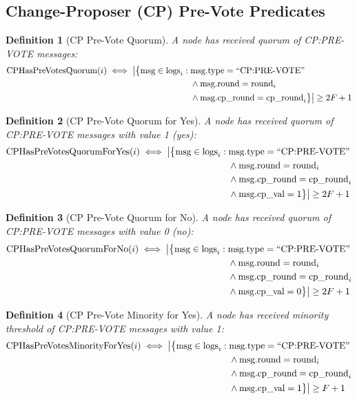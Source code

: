 \documentclass[11pt,a4paper,twoside]{article}
\newtheorem{definition}{Definition}[section]
\begin{document}
\subsection{Change-Proposer (CP) Pre-Vote Predicates}

\begin{definition}[CP Pre-Vote Quorum]
A node has received quorum of CP:PRE-VOTE messages:
\begin{align}
\text{CPHasPreVotesQuorum}(i) \iff \big|\big\{\text{msg} \in \text{logs}_i : {} & \text{msg.type} = \text{``CP:PRE-VOTE''} \notag \\
& \land \text{msg.round} = \text{round}_i \notag \\
& \land \text{msg.cp\_round} = \text{cp\_round}_i\big\}\big| \geq 2F + 1
\end{align}
\end{definition}

\begin{definition}[CP Pre-Vote Quorum for Yes]
A node has received quorum of CP:PRE-VOTE messages with value 1 (yes):
\begin{align}
\text{CPHasPreVotesQuorumForYes}(i) \iff \big|\big\{\text{msg} \in \text{logs}_i : {} & \text{msg.type} = \text{``CP:PRE-VOTE''} \notag \\
& \land \text{msg.round} = \text{round}_i \notag \\
& \land \text{msg.cp\_round} = \text{cp\_round}_i \notag \\
& \land \text{msg.cp\_val} = 1\big\}\big| \geq 2F + 1
\end{align}
\end{definition}

\begin{definition}[CP Pre-Vote Quorum for No]
A node has received quorum of CP:PRE-VOTE messages with value 0 (no):
\begin{align}
\text{CPHasPreVotesQuorumForNo}(i) \iff \big|\big\{\text{msg} \in \text{logs}_i : {} & \text{msg.type} = \text{``CP:PRE-VOTE''} \notag \\
& \land \text{msg.round} = \text{round}_i \notag \\
& \land \text{msg.cp\_round} = \text{cp\_round}_i \notag \\
& \land \text{msg.cp\_val} = 0\big\}\big| \geq 2F + 1
\end{align}
\end{definition}

\begin{definition}[CP Pre-Vote Minority for Yes]
A node has received minority threshold of CP:PRE-VOTE messages with value 1:
\begin{align}
\text{CPHasPreVotesMinorityForYes}(i) \iff \big|\big\{\text{msg} \in \text{logs}_i : {} & \text{msg.type} = \text{``CP:PRE-VOTE''} \notag \\
& \land \text{msg.round} = \text{round}_i \notag \\
& \land \text{msg.cp\_round} = \text{cp\_round}_i \notag \\
& \land \text{msg.cp\_val} = 1\big\}\big| \geq F + 1
\end{align}
\end{definition}
\end{document}

